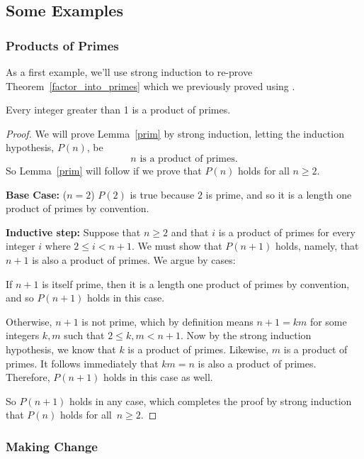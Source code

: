 \subsection{Some Examples}

\subsubsection{Products of Primes}

As a first example, we'll use strong induction to re-prove
Theorem~\ref{factor_into_primes} which we previously proved using .

\begin{lemma}\label{prim}
Every integer greater than 1 is a product of primes.
\end{lemma}

\begin{proof}

We will prove Lemma~\ref{prim} by strong induction, letting the induction
hypothesis, $P(n)$, be
\[
n \text{ is a product of primes}.
\]
So Lemma~\ref{prim} will follow if we prove that $P(n)$ holds for all $n
\geq 2$.

\textbf{Base Case:} ($n=2$) $P(2)$ is true because $2$ is prime, and so it is
a length one product of primes by convention.

\textbf{Inductive step:} Suppose that $n \geq 2$ and that $i$ is a product
of primes for every integer $i$ where $2 \leq i < n+1$.  We must show that
$P(n+1)$ holds, namely, that $n+1$ is also a product of primes.  We argue
by cases:

If $n+1$ is itself prime, then it is a length one product of primes by
convention, and so $P(n+1)$ holds in this case.

Otherwise, $n + 1$ is not prime, which by definition means $n+1 = km$ for
some integers $k,m$ such that $2 \leq k,m < n+1$.  Now by the strong induction
hypothesis, we know that $k$ is a product of primes.  Likewise,
$m$ is a product of primes.  It follows immediately that $km = n$ is
also a product of primes.  Therefore, $P(n+1)$ holds in this case as well.

So $P(n+1)$ holds in any case, which completes the proof by strong
induction that $P(n)$ holds for all~$n \ge 2$.

\end{proof}

\subsubsection{Making Change}

